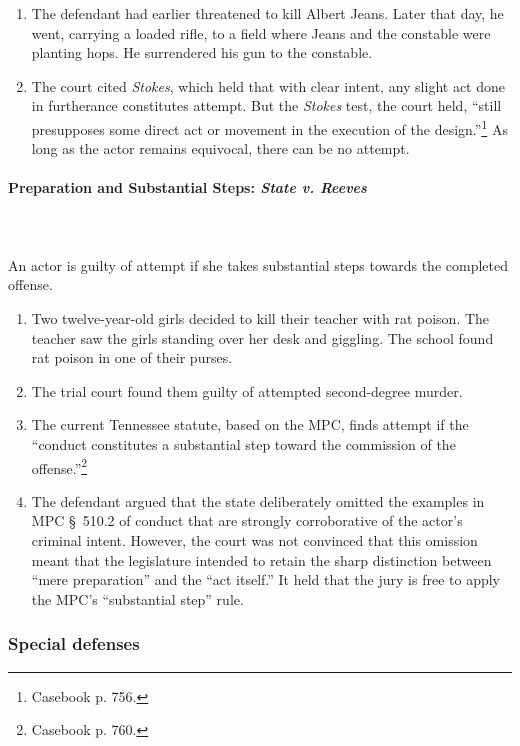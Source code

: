 \begin{enumerate}
    \item The defendant had earlier threatened to kill Albert Jeans. Later 
    that day, he went, carrying a loaded rifle, to a field where Jeans and the 
    constable were planting hops. He surrendered his gun to the constable.
    \item The court cited \emph{Stokes}, which held that with clear intent, 
    any slight act done in furtherance constitutes attempt. But the 
    \emph{Stokes} test, the court held, ``still presupposes some direct act or 
    movement in the execution of the design.''\footnote{Casebook p. 756.} As 
    long as the actor remains equivocal, there can be no attempt.
\end{enumerate}

\paragraph{Preparation and Substantial Steps: \emph{State v. Reeves}}
~\\\\
An actor is guilty of attempt if she takes substantial steps towards the 
completed offense.

\begin{enumerate}
    \item Two twelve-year-old girls decided to kill their teacher with rat 
    poison. The teacher saw the girls standing over her desk and giggling. The 
    school found rat poison in one of their purses.
    \item The trial court found them guilty of attempted second-degree murder.
    \item The current Tennessee statute, based on the MPC, finds attempt if 
    the ``conduct constitutes a substantial step toward the commission of the 
    offense.''\footnote{Casebook p. 760.}
    \item The defendant argued that the state deliberately omitted the 
    examples in MPC \S\ 510.2 of conduct that are strongly corroborative of 
    the actor's criminal intent. However, the court was not convinced that 
    this omission meant that the legislature intended to retain the sharp 
    distinction between ``mere preparation'' and the ``act itself.'' It held 
    that the jury is free to apply the MPC's ``substantial step'' rule.
\end{enumerate}

\subsubsection{Special defenses}


